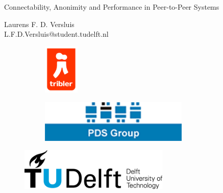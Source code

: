 \begin{titlepage}

\null\vfill

\begin{center}
\LARGE{Connectability, Anonimity and Performance in Peer-to-Peer Systems}
\end{center}

\vspace{1.5cm}

\begin{center}
Laurens F. D. Versluis\\
L.F.D.Versluis@student.tudelft.nl
\end{center}

\vfill

\centering
\begin{figure}[!b]
\captionsetup[subfigure]{labelformat=empty}
\begin{subfigure}{0.3\textwidth}
\centering
\includegraphics[height=2.4cm]{pics/triblerlogo}
\caption{}
\end{subfigure}%
\begin{subfigure}{0.7\textwidth}
\centering
\includegraphics[height=2cm]{pics/pdslogo}
\caption{}
\end{subfigure}%
\end{figure}

\begin{figure}[!b]
\centering
\includegraphics[height=2cm]{pics/TUDLogo}
\end{figure}


\vspace{2.0cm}

\end{titlepage}
